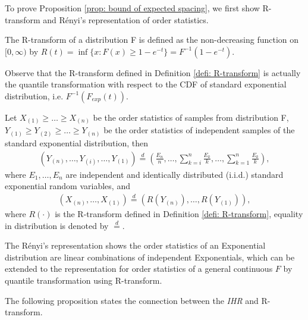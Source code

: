 To prove Proposition \ref{prop: bound of expected spacing}, we first show R-transform and R\'enyi's representation of order statistics.

\begin{defi} [R-transform]
\label{defi: R-transform}
The R-transform of a distribution F is defined as the non-decreasing function on $[0, \infty)$ by $R(t) = \inf\{x: F(x) \geq 1 - e^{-t}\} = F^{-1}(1-e^{-t})$.
\end{defi}
Observe that the R-transform defined in Definition \ref{defi: R-transform} is actually the quantile transformation with respect to the CDF of standard exponential distribution, i.e. $F^{-1}\left(F_{exp}\left(t\right)\right)$.

\begin{theo} 
\label{theo: Renyi's representation}
Let $X_{\left(1\right)} \geq \ldots \geq X_{\left(n\right)}$ be the order statistics of samples from distribution F, $Y_{\left(1\right)} \geq Y_{\left(2\right)} \geq \ldots \geq Y_{\left(n\right)}$ be the
order statistics of independent samples of the standard exponential distribution, then
\begin{align}
{\scriptstyle
    \left(Y_{\left(n\right)}, \ldots, Y_{\left(i\right)}, \ldots, Y_{\left(1\right)}\right)  \stackrel{d}{=} \left(\frac{E_{n}}{n}, \ldots, \sum_{k=i}^{n} \frac{E_{k}}{k}, \ldots, \sum_{k=1}^{n} \frac{E_{k}}{k}\right),
}
\end{align}
where $E_{1}, \ldots, E_{n}$ are independent and identically distributed (i.i.d.) standard exponential random variables, and
\begin{align}
    \left(X_{\left(n\right)}, \ldots, X_{\left(1\right)}\right) \stackrel{d}{=} \left(R \left(Y_{\left(n\right)}\right), \ldots, R \left(Y_{\left(1\right)}\right)\right),
\end{align}
where $R\left(\cdot\right)$ is the R-transform defined in Definition \ref{defi: R-transform}, equality in distribution is denoted by $\stackrel{d}{=}$.
\end{theo}

The R\'enyi's representation shows the order statistics of an Exponential distribution are linear combinations of independent Exponentials, which can be extended to the representation for order statistics of a general continuous $F$ by quantile transformation using R-transform. 

The following proposition states the connection between the \textit{IHR} and R-transform.

